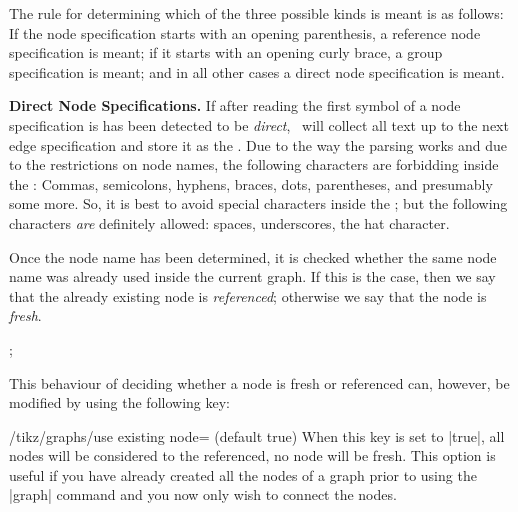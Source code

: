 The rule for determining which of the three possible kinds is meant is
as follows: If the node specification starts with an opening
parenthesis, a reference node specification is meant; if it starts
with an opening curly brace, a group specification is meant; and in
all other cases a direct node specification is meant.

\medskip
\textbf{Direct Node Specifications.} If after reading the first symbol
of a node specification is has been detected to be \emph{direct},
\tikzname\ will collect all text up to the next edge
specification and store it as the . Due to the way the
parsing works and due to the restrictions on node names, the following
characters are forbidding inside the : Commas,
semicolons, hyphens, braces, dots, parentheses, and
presumably some more. So, it is best to avoid special characters
inside the ; but the following characters \emph{are}
definitely allowed: spaces, underscores, the hat character.

Once the node name has been determined, it is checked whether the same
node name was already used inside the current graph. If this is the
case, then we say that the already existing node is \emph{referenced};
otherwise we say that the node is \emph{fresh}.

\begin{codeexample}[]
\tikz {};
\end{codeexample}

This behaviour of
deciding whether a node is fresh or referenced can, however, be
modified by using the following key:
\begin{key}{/tikz/graphs/use existing node= (default true)}
  When this key is set to |true|, all nodes will be considered to the
  referenced, no node will be fresh. This option is useful if you have
  already created all the nodes of a graph prior to using the |graph|
  command and you now only wish to connect the nodes.
\end{key}

